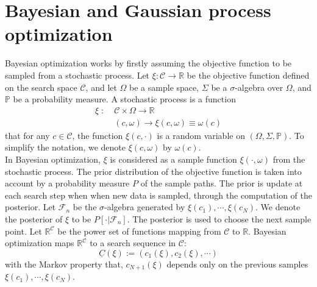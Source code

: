 \documentclass[a4paper,onecolumn]{article}
\theoremstyle{remark}
\begin{document}
\section{Bayesian and Gaussian process optimization}
\label{GPO}
Bayesian optimization works by firstly assuming the objective function to be sampled
from a stochastic process. Let $\xi: \mathcal{C}\rightarrow \mathbb{R}$
be the objective function defined on the search space $\mathcal{C}$, and let
$\Omega$ be a sample space, $\Sigma$ be a $\sigma$-algebra over $\Omega$, and
$\mathbb{P}$ be a probability measure. A stochastic process is a function
\begin{equation}\begin{split}
    \xi \; :\; & \mathcal{C} \times \Omega \rightarrow \mathbb{R}\\
         & (c, \omega) \rightarrow \xi(c,\omega) \equiv \omega(c)
\end{split}\label{stochastic process}
\end{equation}
that for any $c\in \mathcal{C}$, the function $\xi(c, \cdot)$ is a random variable
on $(\Omega, \Sigma, \mathbb{P})$. To simplify the notation, we denote $\xi(c,\omega)$ 
by $\omega(c)$.\\

In Bayesian optimization, $\xi$ is considered as a sample function $\xi(\cdot, \omega)$ from 
the stochastic process. The prior distribution of the objective function is taken into account by a
probability measure $P$ of the sample paths. The prior is update at each search step when when new data 
is sampled, through the computation of the posterior.
Let $\mathcal{F}_n$ be the $\sigma$-algebra generated by $\xi(c_1), \cdots, \xi(c_N)$.
We denote the posterior of $\xi$ to be $P\left[\cdot| \mathcal{F}_n\right]$.
The posterior is used to choose the next sample point.
Let $\mathbb{R}^\mathcal{C}$ be the power set of functions mapping from $\mathcal{C}$ to 
$\mathbb{R}$. 
Bayesian optimization maps $\mathbb{R}^\mathcal{C}$ to a search sequence in $\mathcal{C}$:
\begin{equation}
    \underline{C}(\xi) := \left(c_1(\xi), c_2(\xi), \cdots \right)
\end{equation}
with the Markov property that, $c_{N+1}(\xi)$ depends only on the previous samples
$\xi(c_1),\cdots, \xi(c_N)$.\\
\end{document}
